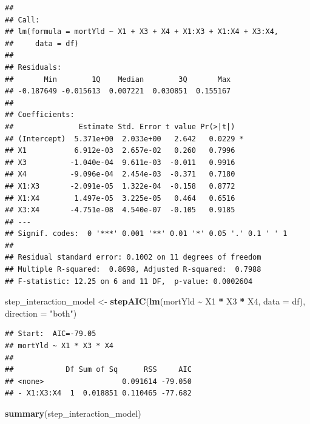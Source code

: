 \documentclass[
  12pt,
]{article}
\newenvironment{Shaded}{\begin{snugshade}}{\end{snugshade}}
\newcommand{\AttributeTok}[1]{\textcolor[rgb]{0.13,0.29,0.53}{#1}}
\newcommand{\FunctionTok}[1]{\textcolor[rgb]{0.13,0.29,0.53}{\textbf{#1}}}
\newcommand{\NormalTok}[1]{#1}
\newcommand{\OtherTok}[1]{\textcolor[rgb]{0.56,0.35,0.01}{#1}}
\newcommand{\SpecialCharTok}[1]{\textcolor[rgb]{0.81,0.36,0.00}{\textbf{#1}}}
\newcommand{\StringTok}[1]{\textcolor[rgb]{0.31,0.60,0.02}{#1}}
\begin{document}
\begin{verbatim}
## 
## Call:
## lm(formula = mortYld ~ X1 + X3 + X4 + X1:X3 + X1:X4 + X3:X4, 
##     data = df)
## 
## Residuals:
##       Min        1Q    Median        3Q       Max 
## -0.187649 -0.015613  0.007221  0.030851  0.155167 
## 
## Coefficients:
##               Estimate Std. Error t value Pr(>|t|)  
## (Intercept)  5.371e+00  2.033e+00   2.642   0.0229 *
## X1           6.912e-03  2.657e-02   0.260   0.7996  
## X3          -1.040e-04  9.611e-03  -0.011   0.9916  
## X4          -9.096e-04  2.454e-03  -0.371   0.7180  
## X1:X3       -2.091e-05  1.322e-04  -0.158   0.8772  
## X1:X4        1.497e-05  3.225e-05   0.464   0.6516  
## X3:X4       -4.751e-08  4.540e-07  -0.105   0.9185  
## ---
## Signif. codes:  0 '***' 0.001 '**' 0.01 '*' 0.05 '.' 0.1 ' ' 1
## 
## Residual standard error: 0.1002 on 11 degrees of freedom
## Multiple R-squared:  0.8698, Adjusted R-squared:  0.7988 
## F-statistic: 12.25 on 6 and 11 DF,  p-value: 0.0002604
\end{verbatim}

\begin{Shaded}
\begin{Highlighting}[]
\NormalTok{step\_interaction\_model }\OtherTok{\textless{}{-}} \FunctionTok{stepAIC}\NormalTok{(}\FunctionTok{lm}\NormalTok{(mortYld }\SpecialCharTok{\textasciitilde{}}\NormalTok{ X1 }\SpecialCharTok{*}\NormalTok{ X3 }\SpecialCharTok{*}\NormalTok{ X4, }\AttributeTok{data =}\NormalTok{ df), }\AttributeTok{direction =} \StringTok{"both"}\NormalTok{)}
\end{Highlighting}
\end{Shaded}

\begin{verbatim}
## Start:  AIC=-79.05
## mortYld ~ X1 * X3 * X4
## 
##            Df Sum of Sq      RSS     AIC
## <none>                  0.091614 -79.050
## - X1:X3:X4  1  0.018851 0.110465 -77.682
\end{verbatim}

\begin{Shaded}
\begin{Highlighting}[]
\FunctionTok{summary}\NormalTok{(step\_interaction\_model)}
\end{Highlighting}
\end{Shaded}
\end{document}
